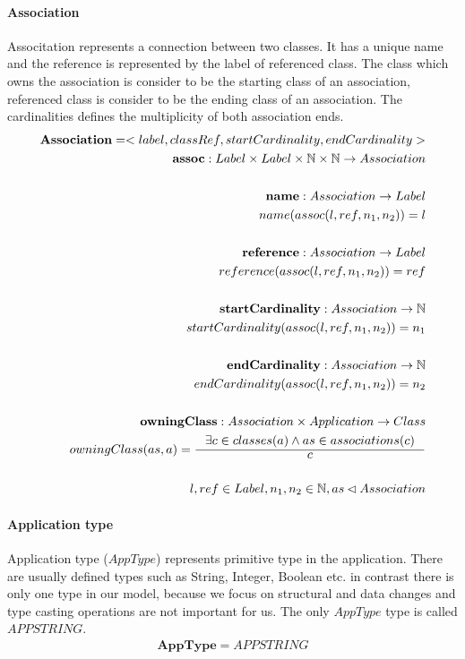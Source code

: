 \documentclass[11pt]{article}
\begin{document}
\paragraph {Association} Associtation represents a connection between two classes. It has a unique name and the reference is represented by the label of referenced class. The class which owns the association is consider to be the starting class of an association, referenced class is consider to be the ending class of an association. The cardinalities defines the multiplicity of both association ends.
\begin{align*}
	\mathbf{Association} = <label, classRef, startCardinality, endCardinality> \\
	\mathbf{assoc} : Label \times Label \times \mathbb{N} \times \mathbb{N} \rightarrow Association\\ \\
	\mathbf{name} : Association \rightarrow Label \\
	name(assoc(l, ref, n_1, n_2)) = l\\ \\
	\mathbf{reference} : Association \rightarrow Label \\
	reference(assoc(l, ref, n_1, n_2)) = ref\\ \\
	\mathbf{startCardinality} : Association \rightarrow \mathbb{N} \\
	startCardinality(assoc(l, ref, n_1, n_2)) = n_1\\ \\
	\mathbf{endCardinality} : Association \rightarrow \mathbb{N} \\
	endCardinality(assoc(l, ref, n_1, n_2)) = n_2 \\ \\
	\mathbf{owningClass} : Association \times Application \rightarrow Class  \\
	owningClass(as, a) = \inference{\exists c \in classes(a) \wedge as \in associations(c)}{c}  \\ \\	
	l, ref \in Label,  n_1, n_2 \in \mathbb{N}, as \lhd Association
\end{align*}



\paragraph{Application type} Application type ($AppType$) represents primitive type in the application. There are usually defined types such as String, Integer, Boolean etc. in contrast there is only one type in our model, because we focus on structural and data changes and type casting operations are not important for us. The only $AppType$ type is called $APPSTRING$.
\begin{align*}
\mathbf{AppType} = APPSTRING
\end{align*}
\end{document}

